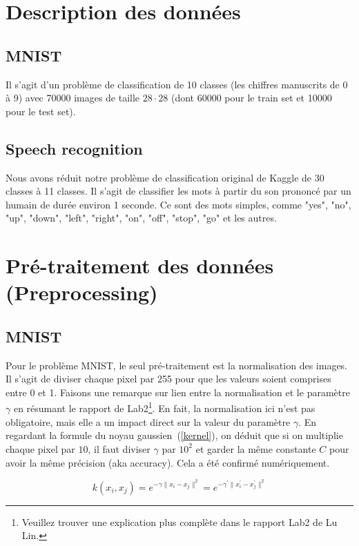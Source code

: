 \documentclass[12 pt, a4paper]{article}
\begin{document}
\section{Description des données}
\subsection{MNIST}
Il s'agit d'un problème de classification de 10 classes (les chiffres manuscrits de 0 à 9) avec 70000 images de taille $28\cdot 28$ (dont 60000 pour le train set et 10000 pour le test set).

\subsection{Speech recognition}
Nous avons réduit notre problème de classification original de Kaggle de 30 classes à 11 classes. Il s'agit de classifier les mots à partir du son prononcé par un humain de durée environ 1 seconde. Ce sont des mots simples, comme "yes", "no", "up", "down", "left", "right", "on", "off", "stop", "go" et les autres.



\section{Pré-traitement des données (Preprocessing)}
\subsection{MNIST}
Pour le problème MNIST, le seul pré-traitement est la normalisation des images. Il s'agit de diviser chaque pixel par 255 pour que les valeurs soient comprises entre 0 et 1. Faisons une remarque sur lien entre la normalisation et le paramètre $\gamma$ en résumant le rapport de Lab2\footnote{Veuillez trouver une explication plus complète dans le rapport Lab2 de Lu Lin.}. En fait, la normalisation ici n'est pas obligatoire, mais elle a un impact direct sur la valeur du paramètre $\gamma$. En regardant la formule du noyau gaussien~(\ref{kernel}), on déduit que si on multiplie chaque pixel par $10$, il faut diviser $\gamma$ par $10^{2}$ et garder la même constante $C$ pour avoir la même précision (aka accuracy). Cela a été confirmé numériquement. 

\begin{equation}\label{kernel}
k(x_{i}, x_{j}) = e^{-\gamma \| x_{i}- x_{j} \|^{2}} = e^{-\gamma^{\prime} \| x_{i}^{\prime}-x_{j}^{\prime}\|^{2}}
\end{equation}
\end{document}
